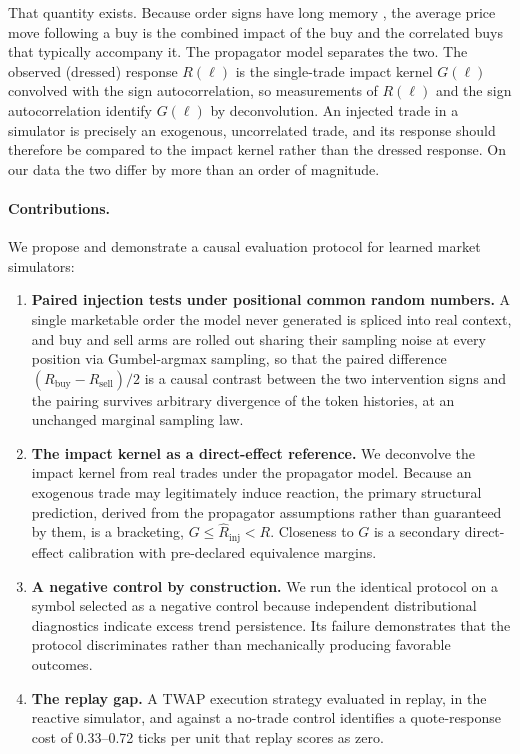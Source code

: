 \documentclass[sigconf,anonymous]{acmart}
\newcommand{\Rl}{R(\ell)}
\newcommand{\Gl}{G(\ell)}
\begin{document}
That quantity exists. Because order signs have long memory \citep{lillofarmer2004}, the average price move following a buy is the combined impact of the buy and the correlated buys that typically accompany it. The propagator model \citep{bouchaud2004,taranto2016} separates the two. The observed (dressed) response $\Rl$ is the single-trade impact kernel $\Gl$ convolved with the sign autocorrelation, so measurements of $\Rl$ and the sign autocorrelation identify $\Gl$ by deconvolution. An injected trade in a simulator is precisely an exogenous, uncorrelated trade, and its response should therefore be compared to the impact kernel rather than the dressed response. On our data the two differ by more than an order of magnitude.

\paragraph{Contributions.} We propose and demonstrate a causal evaluation protocol for learned market simulators:
\begin{enumerate}
\item \textbf{Paired injection tests under positional common random numbers.} A single marketable order the model never generated is spliced into real context, and buy and sell arms are rolled out sharing their sampling noise at every position via Gumbel-argmax sampling, so that the paired difference $(R_{\mathrm{buy}}-R_{\mathrm{sell}})/2$ is a causal contrast between the two intervention signs and the pairing survives arbitrary divergence of the token histories, at an unchanged marginal sampling law.
\item \textbf{The impact kernel as a direct-effect reference.} We deconvolve the impact kernel from real trades under the propagator model. Because an exogenous trade may legitimately induce reaction, the primary structural prediction, derived from the propagator assumptions rather than guaranteed by them, is a bracketing, $G \le \hat{R}_{\mathrm{inj}} < R$. Closeness to $G$ is a secondary direct-effect calibration with pre-declared equivalence margins.
\item \textbf{A negative control by construction.} We run the identical protocol on a symbol selected as a negative control because independent distributional diagnostics indicate excess trend persistence. Its failure demonstrates that the protocol discriminates rather than mechanically producing favorable outcomes.
\item \textbf{The replay gap.} A TWAP execution strategy evaluated in replay, in the reactive simulator, and against a no-trade control identifies a quote-response cost of 0.33--0.72 ticks per unit that replay scores as zero.
\end{enumerate}
\end{document}

